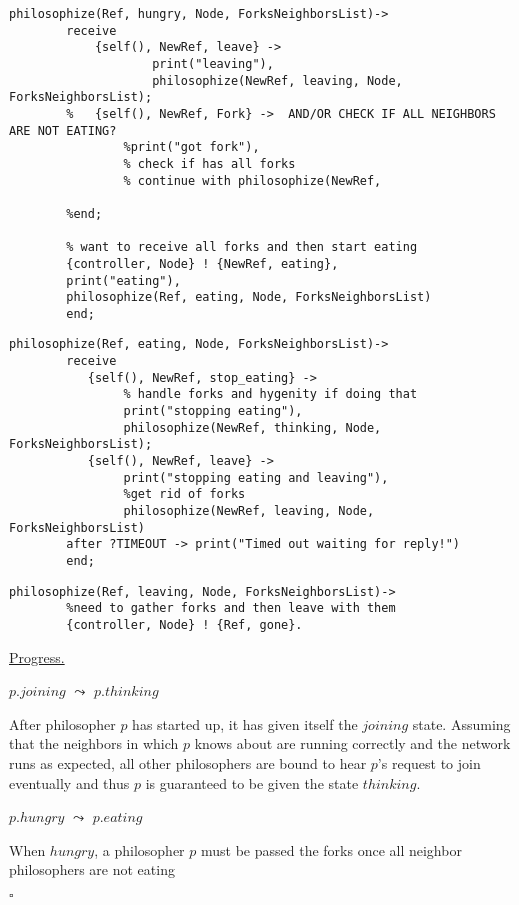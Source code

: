 \documentclass[11pt]{article}
\newenvironment{solution}{\noindent{\bf Solution.} }{

\hfill$\square$}
\begin{document}
\begin{solution}
\begin{lstlisting}
philosophize(Ref, hungry, Node, ForksNeighborsList)->
        receive
            {self(), NewRef, leave} ->
                    print("leaving"),
                    philosophize(NewRef, leaving, Node, ForksNeighborsList);
        %   {self(), NewRef, Fork} ->  AND/OR CHECK IF ALL NEIGHBORS ARE NOT EATING?
                %print("got fork"),
                % check if has all forks
                % continue with philosophize(NewRef, 

        %end;

        % want to receive all forks and then start eating
        {controller, Node} ! {NewRef, eating},
        print("eating"),
        philosophize(Ref, eating, Node, ForksNeighborsList)
        end;
\end{lstlisting}
\begin{lstlisting}
philosophize(Ref, eating, Node, ForksNeighborsList)->
        receive
           {self(), NewRef, stop_eating} ->
                % handle forks and hygenity if doing that
                print("stopping eating"),
                philosophize(NewRef, thinking, Node, ForksNeighborsList);
           {self(), NewRef, leave} ->
                print("stopping eating and leaving"),
                %get rid of forks
                philosophize(NewRef, leaving, Node, ForksNeighborsList)
        after ?TIMEOUT -> print("Timed out waiting for reply!")
        end;
\end{lstlisting}

\begin{lstlisting}
philosophize(Ref, leaving, Node, ForksNeighborsList)->
        %need to gather forks and then leave with them
        {controller, Node} ! {Ref, gone}.
\end{lstlisting}
\begin{enumerate}
\underline{\large{Progress.}}

$p.joining$ $\leadsto$ $p.thinking$

\indent After philosopher $p$ has started up, it has given itself the $joining$ state. Assuming that the neighbors in which $p$ knows about are running correctly and the network runs as expected, all other philosophers are bound to hear $p$'s request to join eventually and thus $p$ is guaranteed to be given the state $thinking$.

$p.hungry$ $\leadsto$ $p.eating$

\indent When $hungry$, a philosopher $p$ must be passed the forks once all neighbor philosophers are not eating


\end{enumerate}
\end{solution}
\end{document}
